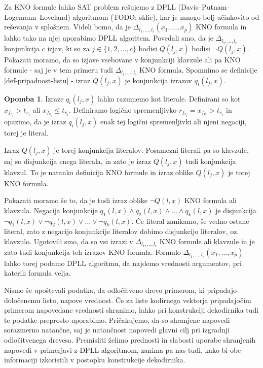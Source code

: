 \documentclass[12pt,a4paper,twoside]{article}
\theoremstyle{definition} %
\newtheorem{opomba}[definicija]{Opomba}
\theoremstyle{plain} %
\numberwithin{equation}{section}  %
\begin{document}
Za KNO formule lahko SAT problem rešujemo z DPLL (Davis--\-Putnam--\-Logemann--\-Loveland) algoritmom (TODO: sklic), kar je mnogo bolj učinkovito od reševanja v splošnem. %
Videli bomo, da je $\Delta_{l_1,\ldots,l_c}(x_1,\ldots,x_p)$ KNO formula in lahko tako na njej uporabimo DPLL algoritem.
Povedali smo, da je $\Delta_{l_1,\ldots,l_c}$ konjunkcija $c$ izjav, ki so za $j \in \{1,2,\ldots,c\}$ bodisi $Q(l_j,x)$ bodisi $\lnot Q(l_j,x)$.
Pokazati moramo, da so izjave vsebovane v konjunkciji klavzule ali pa KNO formule - saj je v tem primeru tudi $\Delta_{l_1,\ldots,l_c}$ KNO formula.
Spomnimo se definicije \ref{def-pripadnost-listu} - izraz $Q(l_j,x)$ je konjunkcija izrazov $q_i(l_j,x)$.
%
\begin{opomba}
	Izraze $q_i(l_j,x)$ lahko razumemo kot literale.
	Definirani so kot $x_{f_{v_i}} > t_{v_i}$ ali $x_{f_{v_i}} \leq t_{v_i}$.
	Definiramo logično spremenljivko $r_{f_{v_i}} = x_{f_{v_i}} > t_{v_i}$ in opazimo, 
	da je izraz $q_i(l_j,x)$ enak tej logični spremenljivki ali njeni negaciji, torej je literal.
\end{opomba}
% 
Izraz $Q(l_j,x)$ je torej konjunkcija literalov.
Posamezni literali pa so klavzule, saj so disjunkcija enega literala, in zato je izraz $Q(l_j,x)$ tudi konjunkcija klavzul.
To je natanko definicija KNO formule in izraz oblike $Q(l_j,x)$ je torej KNO formula.

Pokazati moramo še to, da je tudi izraz oblike $\lnot Q(l,x)$ KNO formula ali klavzula.
Negacija konjunkcije $q_1(l,x) \land q_2(l,x) \land \ldots \land q_k(l,x)$ je disjunkcija $\lnot q_1(l,x) \lor \lnot q_2(l,x) \lor \ldots \lor \lnot q_k(l,x)$.
Če literal zanikamo, še vedno ostane literal, zato z negacijo konjunkcije literalov dobimo disjunkcijo literalov, oz. klavzulo.
Ugotovili smo, da so vsi izrazi v $\Delta_{l_1,\ldots,l_c}$ KNO formule ali klavzule in je zato tudi konjunkcija teh izrazov KNO formula.
Formulo $\Delta_{l_1,\ldots,l_c}(x_1,\ldots,x_p)$ lahko torej podamo DPLL algoritmu, da najdemo vrednosti argumentov, pri katerih formula velja.

Nismo še upoštevali podatka, da odločitveno drevo primerom, ki pripadajo določenemu listu, napove vrednost.
Če za liste kodirnega vektorja pripadajočim primerom napovedane vrednosti shranimo, lahko pri konstrukciji dekodirnika tudi te podatke preprosto uporabimo.
Pričakujemo, da so shranjene napovedi sorazmerno natančne, saj je natančnost napovedi glavni cilj pri izgradnji odločitvenega drevesa.
Premisliti želimo prednosti in slabosti uporabe shranjenih napovedi v primerjavi z DPLL algoritmom, zanima pa nas tudi, kako bi obe informaciji izkoristili v postopku konstrukcije dekodirnika.
\end{document}
